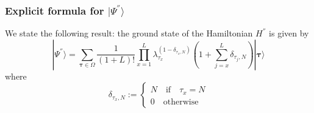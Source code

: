 \documentclass[10pt]{article}
\numberwithin{equation}{section}
\numberwithin{equation}{subsection}
\begin{document}
\subsubsection{Explicit formula for $|\Psi^{''}\rangle$}\label{subsectionSSHsec}
\begin{comment}
\textbf{Notation}: sometimes, in the following, we will denote differently the configuration of this hard-core chain. Each configuration can be written as
\begin{equation}\label{Tau-Notation}
	|\bm{\tau}\rangle=|\tau_{1},\ldots,\tau_{L}\rangle =\begin{pmatrix}
		\tau_{1}\\
		\vdots\\
		\tau_{L}
	\end{pmatrix}
\end{equation} 
with $\tau_{x}\in \{1,\ldots,N\}$, $\forall x\in \{1,\ldots,L\}$. The notation with $\bm{n}$, introduced in Subsection \ref{subsectionGeneratorStr} and the one with $\bm{\tau}$ are related by 
\begin{equation}
	n_{a}^{x}=\delta_{\tau_{x},a}
\end{equation}
\end{comment}
\begin{comment}

This notation is equivalent to the one introduced. Indeed, assume that at site $x$ we have a particle of type $a\in\{1,\ldots,N\} $, then $|n^{x}\rangle$ is composed by zeros but in the component $n_{a}^{x}$ where there is $1$. Therefore, we can uniquely associate  $\tau_{x}=a$ to this $|n^{x}\rangle$, denoting the presence of the species $a$ at site $x$. With this notation, we have that 
\begin{equation}\label{notation}
	|n^{x}\rangle =|\tau_{x}\rangle \qquad \text{and}\qquad|\bm{n}\rangle=|\bm{\tau}\rangle
\end{equation}
with the meaning explained above. It will be useful to introduce also $\bm{\tau}=(\tau_{x})_{x\in \{1,\ldots,L\}}$.
\end{comment} 
We state the following result: the ground state of the Hamiltonian $H^{''}$ is given by 
\begin{equation}\label{ResulsBasis}
	|\Psi^{''} \rangle= \sum_{\bm{\tau}\in \Omega}\frac{1}{\left(1+L\right)!}\prod_{x=1}^{L} \lambda_{\tau_{x}}^{(1-\delta_{\tau_{x},N})}\left(1+\sum_{j=x}^{L}\delta_{\tau_{j},N}\right) |\bm{\tau}\rangle
\end{equation}
where 
\begin{equation}
    \delta_{\tau_{x},N}:=\begin{cases}
        N\quad \text{if}\quad \tau_{x}=N\\
        0\quad \text{otherwise}
    \end{cases}
\end{equation}
\end{document}
